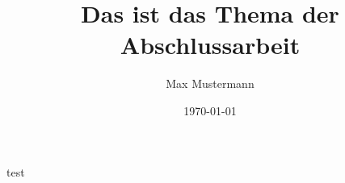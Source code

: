 \documentclass[fakultaet=true]{HtwkThesisDocument}
\title{Das ist das Thema der Abschlussarbeit}
\author{Max Mustermann}
\date{\today}
\begin{document}
	\newpage
	test
\end{document}
